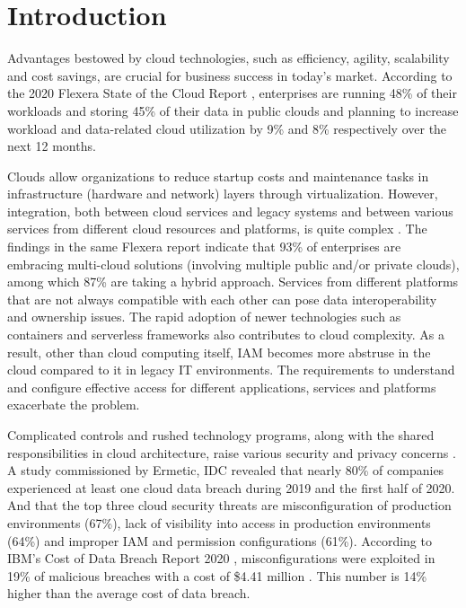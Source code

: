 \documentclass[sigconf]{acmart}
\begin{document}
\section{Introduction}

Advantages bestowed by cloud technologies, such as efficiency, agility, scalability and cost savings, are crucial for business success in today’s market. According to the 2020 Flexera State of the Cloud Report \cite{Flexera2020}, enterprises are running 48\% of their workloads and storing 45\% of their data in public clouds and planning to increase workload and data-related cloud utilization by 9\% and 8\% respectively over the next 12 months. 

Clouds allow organizations to reduce startup costs and maintenance tasks in infrastructure (hardware and network) layers through virtualization. However, integration, both between cloud services and legacy systems and between various services from different cloud resources and platforms, is quite complex \cite{Baron2019}. 
The findings in the same Flexera report \cite{Flexera2020} indicate that 93\% of enterprises are embracing multi-cloud solutions (involving multiple public and/or private clouds), among which 87\% are taking a hybrid approach. Services from different platforms that are not always compatible with each other can pose data interoperability and ownership issues. The rapid adoption of newer technologies such as containers and serverless frameworks also contributes to cloud complexity\cite{Sharrm}. As a result, other than cloud computing itself, IAM becomes more abstruse in the cloud compared to it in legacy IT environments. The requirements to understand and configure effective access for different applications, services and platforms exacerbate the problem. 

Complicated controls and rushed technology programs, along with the shared responsibilities in cloud architecture, raise various security and privacy concerns \cite{Takabi2010}. A study \cite{Ermetic2020} commissioned by Ermetic, IDC revealed that nearly 80\% of companies experienced at least one cloud data breach during 2019 and the first half of 2020. And that the top three cloud security threats are misconfiguration of production environments (67\%), lack of visibility into access in production environments (64\%) and improper IAM and permission configurations (61\%). According to IBM's Cost of Data Breach Report 2020 \cite{IBMSecurity2020}, misconfigurations were exploited in 19\% of malicious breaches with a cost of \$4.41 million . This number is 14\% higher than the average cost of data breach.
\end{document}
